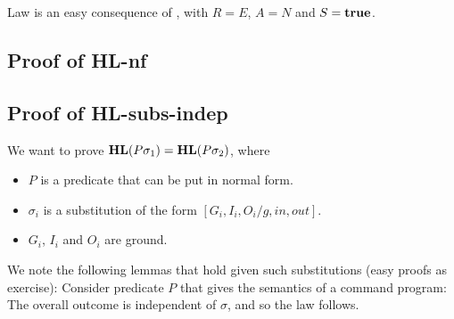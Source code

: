 Law  is an easy consequence of ,
with $R=E$, $A=N$ and $S=\mathbf{true}$.

\newpage
\subsection{Proof of \textsf{HL-nf}}



\newpage
\subsection{Proof of \textsf{HL-subs-indep}}

We want to prove $\mathbf{HL}(P\sigma_1)=\mathbf{HL}(P\sigma_2)$, where
\begin{itemize}
  \item $P$ is a predicate that can be put in normal form.
  \item $\sigma_i$ is a substitution of the form $[G_i,I_i,O_i/g,in,out]$.
  \item $G_i$, $I_i$ and $O_i$ are ground.
\end{itemize}
We note the following lemmas that hold given such substitutions
(easy proofs as exercise):
Consider predicate $P$ that gives the semantics
of a command program:
The overall outcome is independent of $\sigma$,
and so the law follows.


